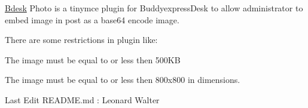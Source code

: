 \hyperlink{namespace_bdesk}{Bdesk} Photo is a tinymce plugin for Buddyexpress\+Desk to allow administrator to embed image in post as a base64 encode image.

There are some restrictions in plugin like\+:
\begin{DoxyEnumerate}
\item The image must be equal to or less then 500\+KB
\item The image must be equal to or less then 800x800 in dimensions.
\end{DoxyEnumerate}

Last Edit R\+E\+A\+D\+M\+E.\+md \+: Leonard Walter 